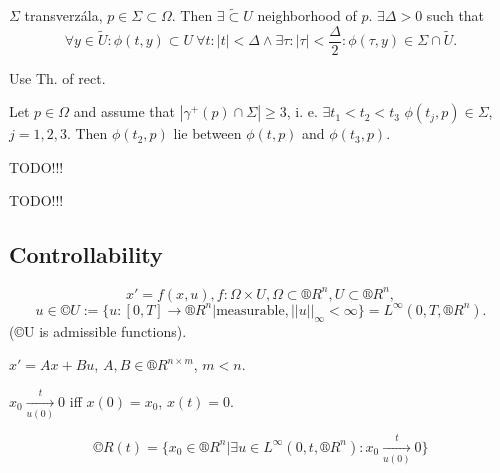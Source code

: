 \documentclass[12pt]{article}					%
\begin{document}
\begin{lemma}
	$\Sigma$ transverzála, $p \in \Sigma \subset \Omega$. Then $\exists \tilde \subset U$ neighborhood of $p$. $\exists \Delta > 0$ such that
	$$ \forall y \in \tilde U: \phi(t, y) \subset U\ \forall t: |t| < \Delta \land \exists \tau: |\tau| < \frac{\Delta}{2}: \phi(\tau, y) \in \Sigma \cap \tilde U. $$

	\begin{dukazin}
		Use Th. of rect.
	\end{dukazin}
\end{lemma}

\begin{lemma}
	Let $p \in \Omega$ and assume that $|\gamma^+(p) \cap \Sigma| ≥ 3$, i. e. $\exists t_1 < t_2 < t_3$ $\phi(t_j, p) \in \Sigma$, $j=1, 2, 3$. Then $\phi(t_2, p)$ lie between $\phi(t, p)$ and $\phi(t_3, p)$.
\end{lemma}


TODO!!!


TODO!!!


\subsection{Controllability}
\begin{definice}
	$$ x' = f(x, u), f: \Omega \times U, \Omega \subset ®R^n, U \subset ®R^n, $$
	$$ u \in ©U := \{u: [0, T] \rightarrow ®R^n | \text{measurable}, ||u||_∞ < ∞\} = L^∞(0, T, ®R^n). $$
	(©U is admissible functions).
\end{definice}

\begin{definice}
	$x' = Ax + Bu$, $A, B \in ®R^{n \times m}$, $m < n$.
\end{definice}

\begin{definice}
	$x_0 \underset{u(0)}{\overset{t}\rightarrow} 0$ iff $x(0) = x_0$, $x(t) = 0$.
\end{definice}

\newcommand{\converg}{\underset{u(0)}{\overset{t}\rightarrow}}
\begin{definice}
	$$ ©R(t) = \{x_0 \in ®R^n | \exists u \in L^∞(0, t, ®R^n): x_0 \underset{u(0)}{\overset{t}\rightarrow} 0 \} $$
\end{definice}
\end{document}
